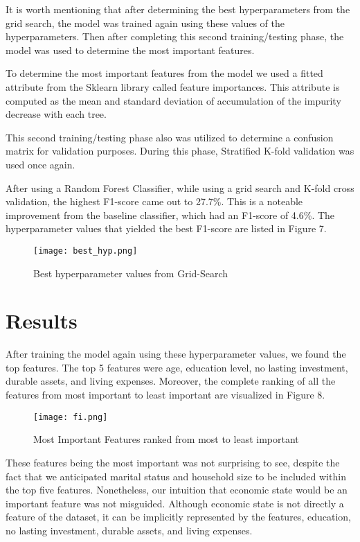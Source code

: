 \documentclass[conference]{IEEEtran}
\begin{document}
It is worth mentioning that after determining the best hyperparameters from the grid search, the model was trained again using these values of the hyperparameters. Then after completing this second training/testing phase, the model was used to determine the most important features.

To determine the most important features from the model we used a fitted attribute from the Sklearn library called feature importances. This attribute is computed as the mean and standard deviation of accumulation of the impurity decrease with each tree. 

This second training/testing phase also was utilized to determine a confusion matrix for validation purposes. During this phase, Stratified K-fold validation was used once again.

After using a Random Forest Classifier, while using a grid search and K-fold cross validation, the highest F1-score came out to 27.7\%. This is a noteable improvement from the baseline classifier, which had an F1-score of 4.6\%. 
The hyperparameter values that yielded the best F1-score are listed in Figure 7.

\begin{figure}[hbt!]
\centering
\texttt{[image: best\_hyp.png]}
\caption{Best hyperparameter values from Grid-Search \label{overflow}}
\end{figure}

\section{Results}

After training the model again using these hyperparameter values, we found the top features. The top 5 features were age, education level, no lasting investment, durable assets, and living expenses. Moreover, the complete ranking of all the features from most important to least important are visualized in Figure 8. 
\begin{figure}[hbt!]
\centering
\texttt{[image: fi.png]}
\caption{Most Important Features ranked from most to least important\label{overflow}}
\end{figure}

These features being the most important was not surprising to see, despite the fact that we anticipated marital status and household size to be included within the top five features. Nonetheless, our intuition that economic state would be an important feature was not misguided. Although economic state is not directly a feature of the dataset, it can be implicitly represented by the features, education, no lasting investment, durable assets, and living expenses.
\end{document}
